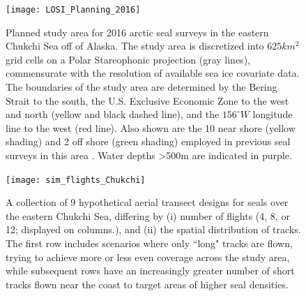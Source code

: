 \documentclass[fleqn,10pt]{wlpeerj}
\begin{document}
\begin{figure}[ht]
\centering
\caption{Planned study area for 2016 arctic seal surveys in the eastern Chukchi Sea off of Alaska. The study area is discretized into $625km^2$ grid cells on a Polar Stareophonic projection (gray lines), commensurate with the resolution of available sea ice covariate data.  The boundaries of the study area are determined by the Bering Strait to the south, the U.S. Exclusive Economic Zone to the west and north (yellow and black dashed line), and the $156^{\circ}W$ longitude line to the west (red line).  Also shown are the 10 near shore (yellow shading) and 2 off shore (green shading) employed in previous seal surveys in this area \citep{Bengtson2005}.  Water depths >500m are indicated in purple.}
\texttt{[image: LOSI\_Planning\_2016]}
\label{fig:Chukchi}
\end{figure}

\begin{figure}[ht]
\centering
\caption{A collection of 9 hypothetical aerial transect designs for seals over the eastern Chukchi Sea, differing by (i) number of flights (4, 8, or 12; displayed on columns.), and (ii) the spatial distribution of tracks.  The first row includes scenarios where only ``long" tracks are flown, trying to achieve more or less even coverage across the study area, while subsequent rows have an increasingly greater number of short tracks flown near the coast to target areas of higher seal densities.}
\texttt{[image: sim\_flights\_Chukchi]}
\label{fig:flights}
\end{figure}

\end{document}
